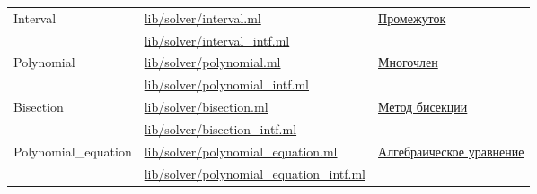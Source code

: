 \begin{centering}
\begin{longtable}{|l|l|l|}
        \multirow{2}{*}{Interval}                             & \href{https://github.com/prekel/chapgame/blob/master/lib/solver/interval.ml}{lib/solver/interval.ml}                                     & \multirow{2}{*}{\hyperref[intervaldescr]{Промежуток}}                   \\*
                                                              & \href{https://github.com/prekel/chapgame/blob/master/lib/solver/interval\_intf.ml}{lib/solver/interval\_intf.ml}                         &                                                                         \\ \hline
        \multirow{2}{*}{Polynomial}                           & \href{https://github.com/prekel/chapgame/blob/master/lib/solver/polynomial.ml}{lib/solver/polynomial.ml}                                 & \multirow{2}{*}{\hyperref[polynomialdescr]{Многочлен}}                  \\*
                                                              & \href{https://github.com/prekel/chapgame/blob/master/lib/solver/polynomial\_intf.ml}{lib/solver/polynomial\_intf.ml}                     &                                                                         \\ \hline
        \multirow{2}{*}{Bisection}                            & \href{https://github.com/prekel/chapgame/blob/master/lib/solver/bisection.ml}{lib/solver/bisection.ml}                                   & \multirow{2}{*}{\hyperref[bisectiondescr]{Метод бисекции}}              \\*
                                                              & \href{https://github.com/prekel/chapgame/blob/master/lib/solver/bisection\_intf.ml}{lib/solver/bisection\_intf.ml}                       &                                                                         \\ \hline
        \multirow{2}{*}{Polynomial\_equation}                 & \href{https://github.com/prekel/chapgame/blob/master/lib/solver/polynomial\_equation.ml}{lib/solver/polynomial\_equation.ml}             & \multirow{2}{3.4cm}{\hyperref[equationdescr]{Алгебраическое уравнение}} \\*
                                                              & \href{https://github.com/prekel/chapgame/blob/master/lib/solver/polynomial\_equation\_intf.ml}{lib/solver/polynomial\_equation\_intf.ml} &                                                                         \\ \hline
    \end{longtable}
\end{centering}

